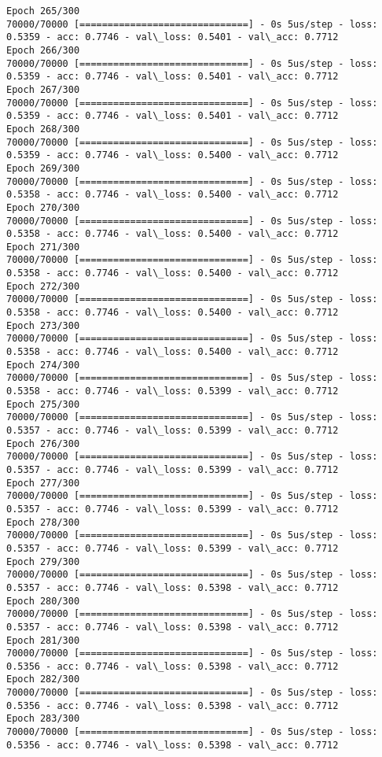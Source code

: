 \documentclass[11pt]{article}
\begin{document}
\begin{Verbatim}[commandchars=\\\{\}]
Epoch 265/300
70000/70000 [==============================] - 0s 5us/step - loss: 0.5359 - acc: 0.7746 - val\_loss: 0.5401 - val\_acc: 0.7712
Epoch 266/300
70000/70000 [==============================] - 0s 5us/step - loss: 0.5359 - acc: 0.7746 - val\_loss: 0.5401 - val\_acc: 0.7712
Epoch 267/300
70000/70000 [==============================] - 0s 5us/step - loss: 0.5359 - acc: 0.7746 - val\_loss: 0.5401 - val\_acc: 0.7712
Epoch 268/300
70000/70000 [==============================] - 0s 5us/step - loss: 0.5359 - acc: 0.7746 - val\_loss: 0.5400 - val\_acc: 0.7712
Epoch 269/300
70000/70000 [==============================] - 0s 5us/step - loss: 0.5358 - acc: 0.7746 - val\_loss: 0.5400 - val\_acc: 0.7712
Epoch 270/300
70000/70000 [==============================] - 0s 5us/step - loss: 0.5358 - acc: 0.7746 - val\_loss: 0.5400 - val\_acc: 0.7712
Epoch 271/300
70000/70000 [==============================] - 0s 5us/step - loss: 0.5358 - acc: 0.7746 - val\_loss: 0.5400 - val\_acc: 0.7712
Epoch 272/300
70000/70000 [==============================] - 0s 5us/step - loss: 0.5358 - acc: 0.7746 - val\_loss: 0.5400 - val\_acc: 0.7712
Epoch 273/300
70000/70000 [==============================] - 0s 5us/step - loss: 0.5358 - acc: 0.7746 - val\_loss: 0.5400 - val\_acc: 0.7712
Epoch 274/300
70000/70000 [==============================] - 0s 5us/step - loss: 0.5358 - acc: 0.7746 - val\_loss: 0.5399 - val\_acc: 0.7712
Epoch 275/300
70000/70000 [==============================] - 0s 5us/step - loss: 0.5357 - acc: 0.7746 - val\_loss: 0.5399 - val\_acc: 0.7712
Epoch 276/300
70000/70000 [==============================] - 0s 5us/step - loss: 0.5357 - acc: 0.7746 - val\_loss: 0.5399 - val\_acc: 0.7712
Epoch 277/300
70000/70000 [==============================] - 0s 5us/step - loss: 0.5357 - acc: 0.7746 - val\_loss: 0.5399 - val\_acc: 0.7712
Epoch 278/300
70000/70000 [==============================] - 0s 5us/step - loss: 0.5357 - acc: 0.7746 - val\_loss: 0.5399 - val\_acc: 0.7712
Epoch 279/300
70000/70000 [==============================] - 0s 5us/step - loss: 0.5357 - acc: 0.7746 - val\_loss: 0.5398 - val\_acc: 0.7712
Epoch 280/300
70000/70000 [==============================] - 0s 5us/step - loss: 0.5357 - acc: 0.7746 - val\_loss: 0.5398 - val\_acc: 0.7712
Epoch 281/300
70000/70000 [==============================] - 0s 5us/step - loss: 0.5356 - acc: 0.7746 - val\_loss: 0.5398 - val\_acc: 0.7712
Epoch 282/300
70000/70000 [==============================] - 0s 5us/step - loss: 0.5356 - acc: 0.7746 - val\_loss: 0.5398 - val\_acc: 0.7712
Epoch 283/300
70000/70000 [==============================] - 0s 5us/step - loss: 0.5356 - acc: 0.7746 - val\_loss: 0.5398 - val\_acc: 0.7712

\end{Verbatim}
\end{document}
